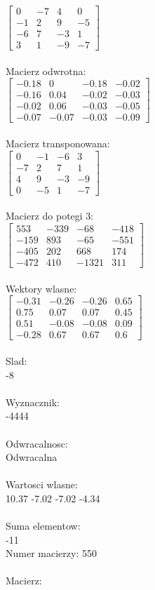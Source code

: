 \documentclass[a4paper,12pt]{article}
\begin{document}
$\begin{bmatrix} 0&-7&4&0\\-1&2&9&-5\\-6&7&-3&1\\3&1&-9&-7 \end{bmatrix}$
\\
\\
Macierz odwrotna:\\

$\begin{bmatrix} -0.18&0&-0.18&-0.02\\-0.16&0.04&-0.02&-0.03\\-0.02&0.06&-0.03&-0.05\\-0.07&-0.07&-0.03&-0.09 \end{bmatrix}$
\\
\\
Macierz transponowana:\\

$\begin{bmatrix} 0&-1&-6&3\\-7&2&7&1\\4&9&-3&-9\\0&-5&1&-7 \end{bmatrix}$
\\
\\
Macierz do potegi 3:\\

$\begin{bmatrix} 553&-339&-68&-418\\-159&893&-65&-551\\-405&202&668&174\\-472&410&-1321&311 \end{bmatrix}$
\\
\\
Wektory wlasne:\\

$\begin{bmatrix} -0.31&-0.26&-0.26&0.65\\0.75&0.07&0.07&0.45\\0.51&-0.08&-0.08&0.09\\-0.28&0.67&0.67&0.6 \end{bmatrix}$
\\
\\
Slad:\\
-8
\\
\\
Wyznacznik:\\
-4444
\\
\\
Odwracalnosc:\\
Odwracalna
\\
\\
Wartosci wlasne:\\
10.37 -7.02 -7.02 -4.34
\\
\\
Suma elementow:\\
-11
\\
\newpage
Numer macierzy:
550
\\
\\
Macierz:\\
\end{document}
